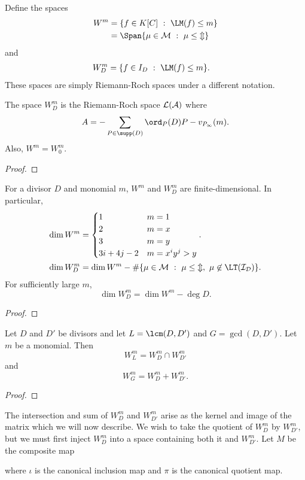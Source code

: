 Define the spaces
\begin{align*}
  W^m &= \{ f \in K[C] ~:~ \LM(f) \leq m \} \\
      &= \Span\{ \mu \in \cal M ~:~ \mu \leq m \}
\end{align*}
and
\begin{align*}
  W_D^m &= \{ f \in I_D ~:~ \LM(f) \leq m \}.
\end{align*}
These spaces are simply Riemann-Roch spaces under a different notation.
\begin{proposition}
  The space $W_D^m$ is the Riemann-Roch space $\cal L (A)$ where
  \[A = - \sum_{P \in \supp(D)} \ord_P(D)P - v_{P_\infty}(m).\]
  Also, $W^m = W_0^m$.
\end{proposition}
\begin{proof}
\end{proof}

\begin{proposition}
  \label{prop_dim_W}
  For a divisor $D$ and monomial $m$, $W^m$ and $W_D^m$ are finite-dimensional.
  In particular,
  \begin{align*}
    \dim W^m &= \begin{cases}
                  1 & m = 1 \\
                  2 & m = x \\
                  3 & m = y \\
                  3i + 4j - 2 & m = x^iy^j > y
                \end{cases}. \\
    \dim W_D^m &= \dim W^m - \# \{ \mu \in \cal M ~:~ \mu \leq m, ~\mu \not\in \LT(I_D) \}.
  \end{align*}
  For sufficiently large $m$,
  \[ \dim W_D^m = \dim W^m - \deg D.\]
\end{proposition}
\begin{proof}
\end{proof}

\begin{proposition}
  Let $D$ and $D'$ be divisors and let $L = \lcm(D, D')$ and $G = \gcd(D, D')$.
  Let $m$ be a monomial. Then
    \[ W_L^m = W_D^m \cap W_{D'}^m \]
  and
    \[ W_G^m = W_D^m + W_{D'}^m. \]
\end{proposition}
\begin{proof}
\end{proof}

The intersection and sum of $W_D^m$ and $W_{D'}^m$ arise as the kernel and image of the matrix which we will now describe.
We wish to take the quotient of $W_D^m$ by $W_{D'}^m$, but we must first inject $W_D^m$ into a space containing both it and $W_{D'}^m$.
Let $M$ be the composite map
\begin{center}
\end{center}
where $\iota$ is the canonical inclusion map and $\pi$ is the canonical quotient map.

